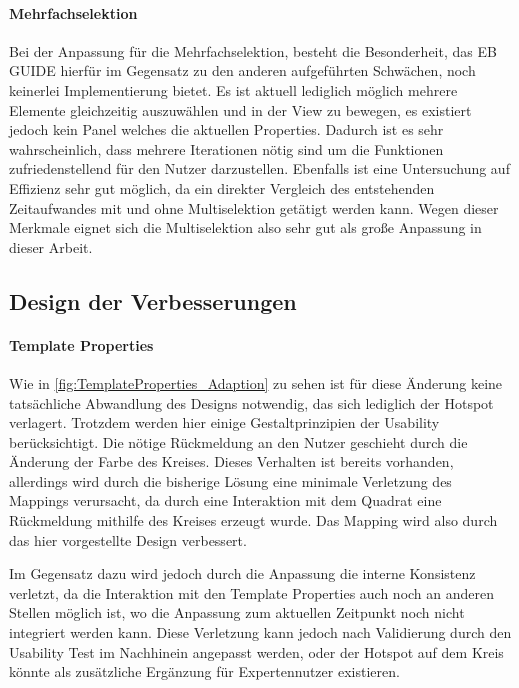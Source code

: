 \paragraph{Mehrfachselektion}
Bei der Anpassung für die Mehrfachselektion, besteht die Besonderheit, das EB GUIDE hierfür im Gegensatz zu den anderen aufgeführten Schwächen, noch keinerlei Implementierung bietet.
Es ist aktuell lediglich möglich mehrere Elemente gleichzeitig auszuwählen und in der View zu bewegen, es existiert jedoch kein Panel welches die aktuellen Properties.
Dadurch ist es sehr wahrscheinlich, dass mehrere Iterationen nötig sind um die Funktionen zufriedenstellend für den Nutzer darzustellen.
Ebenfalls ist eine Untersuchung auf Effizienz sehr gut möglich, da ein direkter Vergleich des entstehenden Zeitaufwandes mit und ohne Multiselektion getätigt werden kann.
Wegen dieser Merkmale eignet sich die Multiselektion also sehr gut als große Anpassung in dieser Arbeit.

\subsection{Design der Verbesserungen}

\paragraph{Template Properties}

Wie in \cref{fig:TemplateProperties_Adaption} zu sehen ist für diese Änderung keine tatsächliche Abwandlung des Designs notwendig, das sich lediglich der Hotspot verlagert.
Trotzdem werden hier einige Gestaltprinzipien der Usability berücksichtigt.
Die nötige Rückmeldung an den Nutzer geschieht durch die Änderung der Farbe des Kreises.
Dieses Verhalten ist bereits vorhanden, allerdings wird durch die bisherige Lösung eine minimale Verletzung des Mappings verursacht, da durch eine Interaktion mit dem Quadrat eine Rückmeldung mithilfe des Kreises erzeugt wurde. 
Das Mapping wird also durch das hier vorgestellte Design verbessert.

Im Gegensatz dazu wird jedoch durch die Anpassung die interne Konsistenz verletzt, da die Interaktion mit den Template Properties auch noch an anderen Stellen möglich ist, wo die Anpassung zum aktuellen Zeitpunkt noch nicht integriert werden kann.
Diese Verletzung kann jedoch nach Validierung durch den Usability Test im Nachhinein angepasst werden, oder der Hotspot auf dem Kreis könnte als zusätzliche Ergänzung für Expertennutzer existieren.


